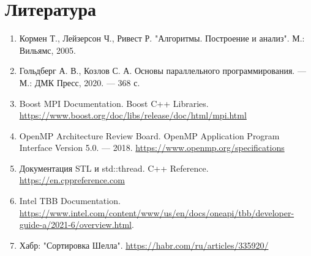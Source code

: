 \documentclass[a4paper,12pt]{article}
\begin{document}
\section{Литература}
\begin{enumerate}
    \item Кормен Т., Лейзерсон Ч., Ривест Р. "Алгоритмы. Построение и анализ". М.: Вильямс, 2005.
    \item Гольдберг А. В., Козлов С. А. Основы параллельного программирования. — М.: ДМК Пресс, 2020. — 368 с.
    \item Boost MPI Documentation. Boost C++ Libraries.  \url{https://www.boost.org/doc/libs/release/doc/html/mpi.html}
\item OpenMP Architecture Review Board. OpenMP Application Program Interface Version 5.0. — 2018. \url{https://www.openmp.org/specifications}
    \item Документация STL и std::thread. C++ Reference.  \url{https://en.cppreference.com}
    \item Intel TBB Documentation. \url{https://www.intel.com/content/www/us/en/docs/oneapi/tbb/developer-guide-a/2021-6/overview.html}.
    \item Хабр: "Сортировка Шелла". \url{https://habr.com/ru/articles/335920/}
\end{enumerate}
\newpage
\end{document}
